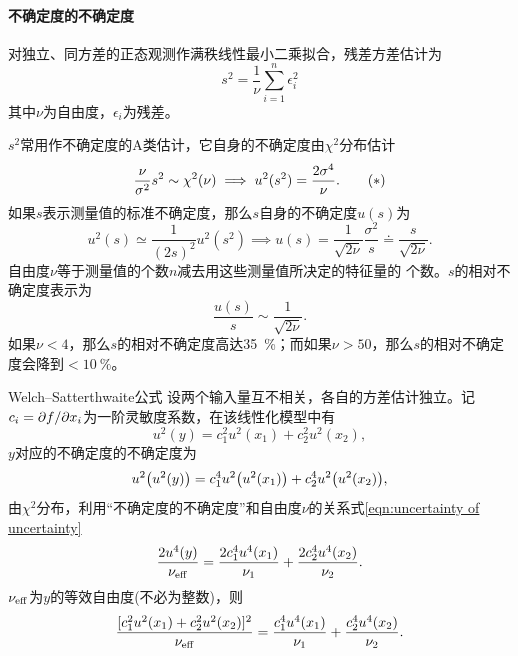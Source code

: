 \paragraph{不确定度的不确定度}
对独立、同方差的正态观测作满秩线性最小二乘拟合，残差方差估计为
\begin{equation}\label{eq:ps-residual-variance}
	s^2 = \frac1\nu\sum_{i=1}^n\epsilon_i^2
\end{equation}
其中$\nu$为自由度，$\epsilon_i$为残差。

$s^2$常用作不确定度的A类估计，它自身的不确定度由$\chi^2$分布估计
\begin{equation}
	\label{eqn:uncertainty of uncertainty}
	\frac\nu{\sigma^2}s^2 \sim \chi^2(\nu) \implies u^2(s^2) = \frac{2\sigma^4}\nu.\tag{$\ast$}
\end{equation}
如果$ s $表示测量值的标准不确定度，那么$ s $自身的不确定度$ u(s) $为
\[
	u^2(s) \simeq \frac1{(2s)^2}u^2(s^2) \implies u(s) = \frac1{\sqrt{2\nu}}\frac{\sigma^2}s \doteq \frac s{\sqrt{2\nu}}.
\]
自由度$\nu$等于测量值的个数$ n $减去用这些测量值所决定的特征量的
个数。$s $的相对不确定度表示为
\begin{equation}\label{eq:ps-uncertainty-relative}
	\frac{u(s)}s \sim \frac1{\sqrt{2\nu}}.
\end{equation}
如果$\nu < 4$，那么$ s $的相对不确定度高达\qty{35}{\percent}；而如果$\nu > 50$，那么$ s $的相对不确定度会降到$< \qty{10}{\percent}$。
\begin{theorem}{Welch--Satterthwaite公式}{}
	设两个输入量互不相关，各自的方差估计独立。记$c_i = \partial f/\partial x_i$为一阶灵敏度系数，在该线性化模型中有
	\[
		u^2(y) = c_1^2u^2(x_1) + c_2^2u^2(x_2),
	\]
	$y $对应的不确定度的不确定度为
	\[
		u^2\bigl(u^2(y)\bigr) = c_1^4u^2\bigl(u^2(x_1)\bigr) + c_2^4u^2\bigl(u^2(x_2)\bigr),
	\]
	由$\chi^2$分布，利用“不确定度的不确定度”和自由度$\nu$的关系式\eqref{eqn:uncertainty of uncertainty}
	\[
		\frac{2u^4(y)}{\nu_{\mathrm{eff}}} = \frac{2c_1^4u^4(x_1)}{\nu_1} + \frac{2c_2^4u^4(x_2)}{\nu_2}.
	\]
	$\nu_{\mathrm{eff}}$为$ y $的等效自由度(不必为整数)，则
	\begin{equation}\label{eq:ps-effective-degrees-of-freedom}
		\frac{[c_1^2u^2(x_1) + c_2^2u^2(x_2)]^2}{\nu_{\mathrm{eff}}} = \frac{c_1^4u^4(x_1)}{\nu_1} + \frac{c_2^4u^4(x_2)}{\nu_2}.
	\end{equation}
\end{theorem}
